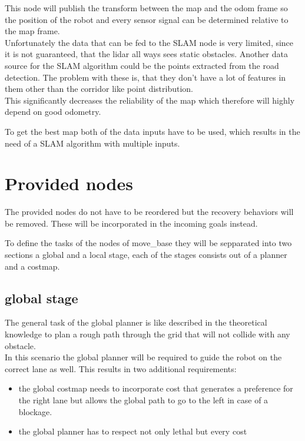 This node will publish the transform between the map and the odom frame so the position of the robot and every sensor signal can be determined relative to the map frame.\\

Unfortunately the data that can be fed to the SLAM node is very limited, since it is not guaranteed, that the lidar all ways sees static obstacles. Another data source for the SLAM algorithm could be the points extracted from the road detection. The problem with these is, that they don't have a lot of features in them other than the corridor like point distribution.\\

This significantly decreases the reliability of the map which therefore will highly depend on good odometry.

To get the best map both of the data inputs have to be used, which results in the need of a SLAM algorithm with multiple inputs.\\

\section{Provided nodes}

The provided nodes do not have to be reordered but the recovery behaviors will be removed. These will be incorporated in the incoming goals instead.

To define the tasks of the nodes of move\_base they will be sepparated into two sections a global and a local stage, each of the stages consists out of a planner and a costmap.\\
\subsection{global stage}
The general task of the global planner is like described in the theoretical knowledge to plan a rough path through the grid that will not collide with any obstacle.\\

In this scenario the global planner will be required to guide the robot on the correct lane as well. This results in two additional requirements:

\begin{itemize}
	\item the global costmap needs to incorporate cost that generates a preference for the right lane but allows the global path to go to the left in case of a blockage.
	\item the global planner has to respect not only lethal but every cost
\end{itemize}

